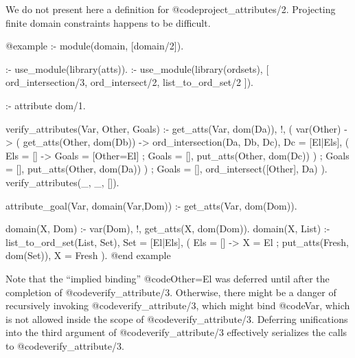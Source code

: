 {{{{{{{{{We do not present here a definition for @code{project_attributes/2}.
Projecting finite domain constraints happens to be difficult.


@example
:- module(domain, [domain/2]).

:- use_module(library(atts)).
:- use_module(library(ordsets), [
        ord_intersection/3,
        ord_intersect/2,
        list_to_ord_set/2
   ]).

:- attribute dom/1.

verify_attributes(Var, Other, Goals) :-
        get_atts(Var, dom(Da)), !,          %
        (   var(Other) ->                   %
            (   get_atts(Other, dom(Db)) -> %
                ord_intersection(Da, Db, Dc),
                Dc = [El|Els],              %
                (   Els = [] ->             %
                    Goals = [Other=El]      %
                ;   Goals = [],
                    put_atts(Other, dom(Dc))%
                )
            ;   Goals = [],
                put_atts(Other, dom(Da))    %
            )
        ;   Goals = [],
            ord_intersect([Other], Da)      %
        ).
verify_attributes(_, _, []).                %

attribute_goal(Var, domain(Var,Dom)) :-     %
        get_atts(Var, dom(Dom)).

domain(X, Dom) :-
        var(Dom), !,
        get_atts(X, dom(Dom)).
domain(X, List) :-
        list_to_ord_set(List, Set),
        Set = [El|Els],                     %
        (   Els = [] ->                     %
            X = El                          %
        ;   put_atts(Fresh, dom(Set)),
            X = Fresh                       %
        ).
@end example

Note that the ``implied binding'' @code{Other=El} was deferred until after
the completion of @code{verify_attribute/3}.  Otherwise, there might be a
danger of recursively invoking @code{verify_attribute/3}, which might bind
@code{Var}, which is not allowed inside the scope of @code{verify_attribute/3}.
Deferring unifications into the third argument of @code{verify_attribute/3}
effectively serializes the calls to @code{verify_attribute/3}.

}}}}}}}}}
